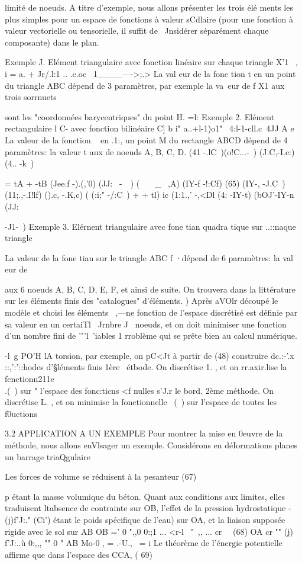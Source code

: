{limité de noeuds. A titre d'exemple, nous allons présenter les trois élé
ments  les  plus simples  pour  un  espace  de  fonctions  à  valeur sCdlaire  (pour  
une  fonction  à  valeur vectorielle  ou  tensorielle,  il  suffit de  ~Jnsidérer  
séparément chaque composante)  dans  le plan.  

Exemple J. Elément triangulaire avec fonction linéaire sur chaque triangle 
X'1 ~,
i = a. + Jr/.l:1 .. .c.oc~ 
1____---->;.> 
La val eur de la fone tion t en un point du triangle ABC dépend de 3 paramètres, par exemple la va~eur de f X1 aux trois sorrnuets 


sont les "coordonnées barycentriques" du point H. 
=l: 
Exemple 2. Elément rectangulaire l 
C-
avec fonction bilinéaire 
C] b 
i" a..+l-1)o1" ~4:l-1-cll.c~4JJ 
A e 
La valeur de la fonction ~ en 
.1:, 
un point M du rectangle ABCD dépend de 4 paramètres: la valeur t aux
de 
noeuds A, B, C, D. 
(41 -.lC~)(o!C...-~) (J.C,-I.e:) (4.. -k~)
{ = tA + -tB
(Jee.f -).(,'0) (JJ:~ -~~) (~~~ _ ~,A) (IY-f -!:Cf) 
(65) 
(IY-, -J.C~) (11;.,-.I!lf) ().c, -.K,c) ( (:i;" -/:C~)
+ + tl)
ic (1:1.,' -,<Dl (4: -IY-t) (bOJ'-IY-n (JJ:{-J1-~) 
Exemple 3. Elérnent triangulaire avec fone tian quadra tique sur ..::naque trian­gle 

La valeur de la fone tian sur le triangle ABC
f 
·dépend de 6 paramètres: la val eur de { aux 6 
noeuds A, B, C, D, E, F, et ainsi de suite. On 
trouvera dans la littérature sur les éléments 
finis des "catalogues" d'éléments. 
) 
Après aVOlr découpé le modèle et choisi les éléments~ ,---ne fonction de l'espace discrétisé est définie par sa valeur en un certaiTl ~Jrnbre J~ noeuds, et on doit minimiser une fonction d'un nombre fini de '"'l~'iables 1 rro­blème qui se prête bien au calcul numérique. 

-l~g 
PO'H lA torsion, par exemple, on pC<Jt à partir de (48) construire dc.:-'.x ::,':'::hodes d'§léments finis 1ère ~étbode. On discrétise 1. , et on rr.axir.lise la fcnctionn211e \\.(~) sur 
"
l'espace des fonc:ticns <f nulles s'J.r le bord. 
2ème méthode. On discrétise L. , et on minimise la fonctionnelle ~(~) sur 
l'espace de toutes les f0uctions ~ 

3.2 APPLICATION A UN EXEMPLE 
Pour montrer la mise en 0euvre de la méthode, nous allons enVlsa­ger un exemple. Considérons en déIormations planes un barrage triaQgulaire 

Les forces de volume se réduisent à la pesanteur 
(67) 

p étant la masse volumique du béton. Quant aux conditions aux limites, elles traduisent ltabsence de contrainte sur OB, l'effet de la pression hydrostatique -(j)f'J:." (Ci') étant le poids spé­cifique de l'eau) sur OA, et la liaison supposée rigide avec le sol sur AB 
OB =' 0 ",,0
0:;1 ... <r-l~ "~,, ... cr~~ 
(68) OA cr "" (j) f'J:..ù 0:,,, "" 0
" 
AB Mo-0
, = .-U.,~ =
i 
Le théorème de l'énergie potentielle affirme que dans l'espace des CCA, 
( 69) 

}}}}
